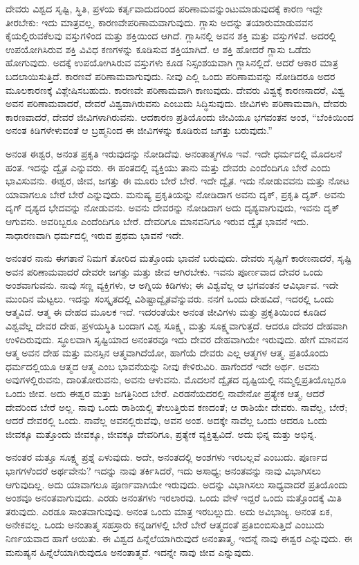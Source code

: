 ದೇವರು ವಿಶ್ವದ ಸೃಷ್ಟಿ, ಸ್ಥಿತಿ, ಪ್ರಳಯ ಕರ್ತೃವಾದುದರಿಂದ ಪರಿಣಾಮವನ್ನುಂಟುಮಾಡುವುದಕ್ಕೆ ಕಾರಣ ಇದ್ದೇ ತೀರಬೇಕು: ಇದು ಮಾತ್ರವಲ್ಲ, ಕಾರಣವೇ\break ಪರಿಣಾಮವಾಗುವುದು. ಗ್ಲಾಸು ಅದನ್ನು ತಯಾರುಮಾಡುವವನ ಕೈಯಲ್ಲಿರುವ\break ಕೆಲವು ವಸ್ತುಗಳಿಂದ ಮತ್ತು ಶಕ್ತಿಯಿಂದ ಆಗಿದೆ. ಗ್ಲಾಸಿನಲ್ಲಿ ಅವನ ಶಕ್ತಿ ಮತ್ತು ವಸ್ತುಗಳಿವೆ. ಅದರಲ್ಲಿ ಉಪಯೋಗಿಸಿರುವ ಶಕ್ತಿ ವಿವಿಧ ಕಣಗಳನ್ನು ಕೂಡಿಸುವ ಶಕ್ತಿಯಾಗಿದೆ. ಆ ಶಕ್ತಿ ಹೋದರೆ ಗ್ಲಾಸು ಒಡೆದು ಹೋಗುವುದು. ಅದಕ್ಕೆ ಉಪಯೋಗಿಸಿರುವ ವಸ್ತುಗಳು ಕೂಡ ನಿಸ್ಸಂಶಯವಾಗಿ ಗ್ಲಾಸಿನಲ್ಲಿದೆ. ಆದರೆ ಆಕಾರ ಮಾತ್ರ ಬದಲಾಯಿಸುತ್ತಿದೆ. ಕಾರಣವೆ ಪರಿಣಾಮವಾಗುವುದು. ನೀವು ಎಲ್ಲಿ ಒಂದು ಪರಿಣಾಮವನ್ನು ನೋಡಿದರೂ ಅದರ ಮೂಲಕಾರಣಕ್ಕೆ ವಿಶ್ಲೇಷಿಸಬಹುದು. ಕಾರಣವೇ ಪರಿಣಾಮವಾಗಿ ಕಾಣುವುದು. ದೇವರು ವಿಶ್ವಕ್ಕೆ ಕಾರಣನಾದರೆ, ವಿಶ್ವ ಅವನ ಪರಿಣಾಮವಾದರೆ, ದೇವರೆ ವಿಶ್ವವಾಗಿರುವನು ಎಂಬುದು ಸಿದ್ಧಿಸುವುದು. ಜೀವಿಗಳು ಪರಿಣಾಮವಾಗಿ, ದೇವರು ಕಾರಣವಾದರೆ, ದೇವರೆ ಜೀವಿಗಳಾಗಿರುವನು. ಆದಕಾರಣ ಪ್ರತಿಯೊಂದು ಜೀವಿಯೂ ಭಗವಂತನ ಅಂಶ, “ಬೆಂಕಿಯಿಂದ ಅನಂತ ಕಿಡಿಗಳೇಳುವಂತೆ ಆ ಬ್ರಹ್ಮನಿಂದ ಈ ಜೀವಿಗಳನ್ನು ಕೂಡಿರುವ ಜಗತ್ತು ಬರುವುದು.”

ಅನಂತ ಈಶ್ವರ, ಅನಂತ ಪ್ರಕೃತಿ ಇರುವುದನ್ನು ನೋಡಿದೆವು. ಅನಂತಾತ್ಮಗಳೂ ಇವೆ. ಇದೇ ಧರ್ಮದಲ್ಲಿ ಮೊದಲನೆ ಹಂತ. ಇದನ್ನು ದ್ವೈತ ಎನ್ನುವರು. ಈ ಹಂತದಲ್ಲಿ ವ್ಯಕ್ತಿಯು ತಾನು ಮತ್ತು ದೇವರು ಎಂದೆಂದಿಗೂ ಬೇರೆ ಎಂದು ಭಾವಿಸುವನು. ಈಶ್ವರ, ಜೀವ, ಜಗತ್ತು ಈ ಮೂರು ಬೇರೆ ಬೇರೆ. ಇದೇ ದ್ವೈತ. ಇದು ನೋಡುವವನು ಮತ್ತು ನೋಟ ಯಾವಾಗಲೂ ಬೇರೆ ಬೇರೆ ಎನ್ನುವುದು. ಮನುಷ್ಯ ಪ್ರಕೃತಿಯನ್ನು ನೋಡಿದಾಗ ಅವನು ದೃಕ್, ಪ್ರಕೃತಿ ದೃಶ್. ಅವನು ದೃಗ್ ದೃಶ್ಯದ ಭೇದವನ್ನು ನೋಡುವನು. ಅವನು ದೇವರನ್ನು ನೋಡಿದಾಗ ಅದು ದೃಶ್ಯವಾಗುವುದು, ಇವನು ದೃಕ್ ಆಗುವನು. ಅವರಿಬ್ಬರೂ ಎಂದೆಂದಿಗೂ ಬೇರೆ. ದೇವರಿಗೂ ಮಾನವನಿಗೂ ಇರುವ ದ್ವೈತ ಭಾವನೆ ಇದು. ಸಾಧಾರಣವಾಗಿ ಧರ್ಮದಲ್ಲಿ ಇರುವ ಪ್ರಥಮ ಭಾವನೆ ಇದೇ.

ಅನಂತರ ನಾನು ಈಗತಾನೆ ನಿಮಗೆ ತೋರಿದ ಮತ್ತೊಂದು ಭಾವನೆ ಬರುವುದು. ದೇವರು ಸೃಷ್ಟಿಗೆ ಕಾರಣನಾದರೆ, ಸೃಷ್ಟಿ ಅವನ ಪರಿಣಾಮವಾದರೆ ದೇವರೇ ಜಗತ್ತು ಮತ್ತು ಜೀವ ಆಗಿರಬೇಕು. ಇವನು ಪೂರ್ಣವಾದ ದೇವರ ಒಂದು ಅಂಶವಾಗುವನು. ನಾವು ಸಣ್ಣ ವ್ಯಕ್ತಿಗಳು, ಆ ಅಗ್ನಿಯ ಕಿಡಿಗಳು; ಈ ವಿಶ್ವವೆಲ್ಲ ಆ ಭಗವಂತನ ಆವಿರ್ಭಾವ. ಇದೇ ಮುಂದಿನ ಮೆಟ್ಟಲು. ಇದನ್ನು ಸಂಸ್ಕೃತದಲ್ಲಿ ವಿಶಿಷ್ಟಾದ್ವೈತವೆನ್ನುವರು. ನನಗೆ ಒಂದು ದೇಹವಿದೆ, ಇದರಲ್ಲಿ ಒಂದು ಆತ್ಮವಿದೆ. ಆತ್ಮ ಈ ದೇಹದ ಮೂಲಕ ಇದೆ. ಇದರಂತೆಯೇ ಅನಂತ ಜೀವಿಗಳು ಮತ್ತು ಪ್ರಕೃತಿಯಿಂದ ಕೂಡಿದ ವಿಶ್ವವೆಲ್ಲ ದೇವರ ದೇಹ, ಪ್ರಳಯಸ್ಥಿತಿ ಬಂದಾಗ ವಿಶ್ವ ಸೂಕ್ಷ್ಮ, ಮತ್ತು ಸೂಕ್ಷ್ಮವಾಗುತ್ತದೆ. ಆದರೂ ದೇವರ ದೇಹವಾಗಿ ಉಳಿದಿರುವುದು. ಸ್ಥೂಲವಾಗಿ ಸೃಷ್ಟಿಯಾದ ಅನಂತರವೂ ಇದು ದೇವರ ದೇಹವಾಗಿಯೇ ಇರುವುದು. ಹೇಗೆ ಮಾನವನ ಆತ್ಮ ಅವನ ದೇಹ ಮತ್ತು ಮನಸ್ಸಿನ ಆತ್ಮವಾಗಿದೆಯೋ, ಹಾಗೆಯೆ ದೇವರು ಎಲ್ಲ ಆತ್ಮಗಳ ಆತ್ಮ. ಪ್ರತಿಯೊಂದು ಧರ್ಮದಲ್ಲಿಯೂ ಆತ್ಮದ ಆತ್ಮ ಎಂಬ ಭಾವನೆಯನ್ನು ನೀವು ಕೇಳಿರುವಿರಿ. ಹಾಗೆಂದರೆ ಇದೇ ಅರ್ಥ. ಅವನು ಅವುಗಳಲ್ಲಿರುವನು, ದಾರಿತೋರುವನು, ಅವನು ಆಳುವನು. ಮೊದಲನೆ ದ್ವೈತದ ದೃಷ್ಟಿಯಲ್ಲಿ ನಮ್ಮಲ್ಲಿ\break ಪ್ರತಿಯೊಬ್ಬರೂ ಒಂದು ಜೀವ. ಅದು ಈಶ್ವರ ಮತ್ತು ಜಗತ್ತಿನಿಂದ ಬೇರೆ. ಎರಡನೆಯದರಲ್ಲಿ ನಾವೇನೋ ಪ್ರತ್ಯೇಕ ಆತ್ಮ, ಆದರೆ ದೇವರಿಂದ ಬೇರೆ ಅಲ್ಲ. ನಾವು ಒಂದು ರಾಶಿಯಲ್ಲಿ ತೇಲುತ್ತಿರುವ ಕಣದಂತೆ; ಆ ರಾಶಿಯೇ ದೇವರು. ನಾವೆಲ್ಲ, ಬೇರೆ; ಆದರೆ ದೇವರಲ್ಲಿ ಒಂದು. ನಾವೆಲ್ಲ ಅವನಲ್ಲಿರುವೆವು, ಅವನ ಅಂಶ. ಅದಕ್ಕೇ ನಾವೆಲ್ಲ ಒಂದು ಆದರೂ ಒಂದು ಜೀವಕ್ಕೂ ಮತ್ತೊಂದು ಜೀವಕ್ಕೂ, ಜೀವಕ್ಕೂ ದೇವರಿಗೂ, ಪ್ರತ್ಯೇಕ ವ್ಯಕ್ತಿತ್ವವಿದೆ. ಅದು ಭಿನ್ನ ಮತ್ತು ಅಭಿನ್ನ.

ಅನಂತರ ಮತ್ತೂ ಸೂಕ್ಷ್ಮ ಪ್ರಶ್ನೆ ಏಳುವುದು. ಅದೇ, ಅನಂತದಲ್ಲಿ ಅಂಶಗಳು ಇರಬಲ್ಲವೆ ಎಂಬುದು. ಪೂರ್ಣದ ಭಾಗಗಳೆಂದರೆ ಅರ್ಥವೇನು? ಇದನ್ನು ನಾವು ತರ್ಕಿಸಿದರೆ, ಇದು ಅಸಾಧ್ಯ; ಅನಂತವನ್ನು ನಾವು ವಿಭಾಗಿಸಲು ಆಗುವುದಿಲ್ಲ. ಅದು ಯಾವಾಗಲೂ ಪೂರ್ಣವಾಗಿಯೇ ಇರುವುದು. ಅದನ್ನು ವಿಭಾಗಿಸಲು ಸಾಧ್ಯವಾದರೆ ಪ್ರತಿಯೊಂದು ಅಂಶವೂ ಅನಂತವಾಗುವುದು. ಎರಡು ಅನಂತಗಳು ಇರಲಾರವು. ಒಂದು ವೇಳೆ ಇದ್ದರೆ ಒಂದು ಮತ್ತೊಂದಕ್ಕೆ ಮಿತಿ ತರುವುದು. ಎರಡೂ ಸಾಂತವಾಗುವುವು. ಅನಂತ ಒಂದು ಮಾತ್ರ ಇರಬಲ್ಲುದು. ಅದು ಅವಿಭಾಜ್ಯ. ಅನಂತ ಏಕ, ಅನೇಕವಲ್ಲ. ಒಂದು ಅನಂತಾತ್ಮ ಸಹಸ್ರಾರು ಕನ್ನಡಿಗಳಲ್ಲಿ ಬೇರೆ ಬೇರೆ ಆತ್ಮದಂತೆ ಪ್ರತಿಬಿಂಬಿಸುತ್ತಿದೆ ಎಂಬುದು ನಿರ್ಣಯವಾದ ಹಾಗೆ ಆಯಿತು. ಈ ವಿಶ್ವದ ಹಿನ್ನೆಲೆಯಾಗಿರುವುದೆ ಅನಂತಾತ್ಮ, ಇದನ್ನೆ ನಾವು ಈಶ್ವರ ಎನ್ನುವುದು. ಈ ಮನುಷ್ಯನ ಹಿನ್ನೆಲೆಯಾಗಿರುವುದೂ ಅನಂತಾತ್ಮವೆ. ಇದನ್ನೇ ನಾವು ಜೀವ ಎನ್ನುವುದು.

